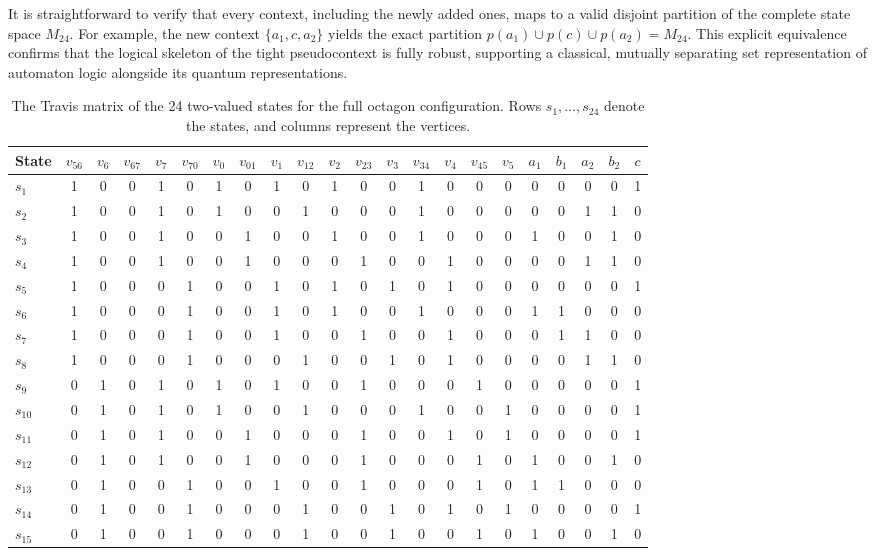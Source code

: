 \documentclass[
  twocolumn,
  aps,
  pra,
  floatfix,
  amsmath,amssymb,
  longbibliography
]{revtex4-2}
\theoremstyle{definition}
\theoremstyle{remark}
\begin{document}
It is straightforward to verify that every context, including the newly added ones, maps to a valid disjoint partition of the complete state space $M_{24}$. For example, the new context $\{a_1, c, a_2\}$ yields the exact partition $p(a_1) \cup p(c) \cup p(a_2) = M_{24}$. This explicit equivalence confirms that the logical skeleton of the tight pseudocontext is fully robust, supporting a classical, mutually separating set representation of automaton logic alongside its quantum representations.



\begin{table}[htb]
\centering
\caption{The Travis matrix of the 24 two-valued states for the full octagon configuration. Rows $s_1, \dots, s_{24}$ denote the states, and columns represent the vertices.}
\label{tab:matrix24}
\footnotesize
\setlength{\tabcolsep}{4.5pt}
\begin{tabular}{l|ccccccccccccccccccccc}
\toprule
State & $v_{56}$ & $v_{6}$ & $v_{67}$ & $v_{7}$ & $v_{70}$ & $v_{0}$ & $v_{01}$ & $v_{1}$ & $v_{12}$ & $v_{2}$ & $v_{23}$ & $v_{3}$ & $v_{34}$ & $v_{4}$ & $v_{45}$ & $v_{5}$ & $a_{1}$ & $b_{1}$ & $a_{2}$ & $b_{2}$ & $c$ \\
\midrule
$s_{1}$  & 1&0&0&1&0&1&0&1&0&1&0&0&1&0&0&0&0&0&0&0&1 \\
$s_{2}$  & 1&0&0&1&0&1&0&0&1&0&0&0&1&0&0&0&0&0&1&1&0 \\
$s_{3}$  & 1&0&0&1&0&0&1&0&0&1&0&0&1&0&0&0&1&0&0&1&0 \\
$s_{4}$  & 1&0&0&1&0&0&1&0&0&0&1&0&0&1&0&0&0&0&1&1&0 \\
$s_{5}$  & 1&0&0&0&1&0&0&1&0&1&0&1&0&1&0&0&0&0&0&0&1 \\
$s_{6}$  & 1&0&0&0&1&0&0&1&0&1&0&0&1&0&0&0&1&1&0&0&0 \\
$s_{7}$  & 1&0&0&0&1&0&0&1&0&0&1&0&0&1&0&0&0&1&1&0&0 \\
$s_{8}$  & 1&0&0&0&1&0&0&0&1&0&0&1&0&1&0&0&0&0&1&1&0 \\
$s_{9}$  & 0&1&0&1&0&1&0&1&0&0&1&0&0&0&1&0&0&0&0&0&1 \\
$s_{10}$ & 0&1&0&1&0&1&0&0&1&0&0&0&1&0&0&1&0&0&0&0&1 \\
$s_{11}$ & 0&1&0&1&0&0&1&0&0&0&1&0&0&1&0&1&0&0&0&0&1 \\
$s_{12}$ & 0&1&0&1&0&0&1&0&0&0&1&0&0&0&1&0&1&0&0&1&0 \\
$s_{13}$ & 0&1&0&0&1&0&0&1&0&0&1&0&0&0&1&0&1&1&0&0&0 \\
$s_{14}$ & 0&1&0&0&1&0&0&0&1&0&0&1&0&1&0&1&0&0&0&0&1 \\
$s_{15}$ & 0&1&0&0&1&0&0&0&1&0&0&1&0&0&1&0&1&0&0&1&0 \\

\end{tabular}
\end{table}
\end{document}
